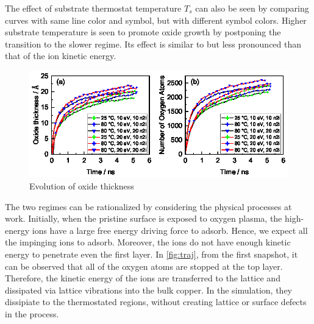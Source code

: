 \documentclass[manuscript=cmatex]{achemso}
\begin{document}
The effect of substrate thermostat temperature $T_s$ can also be seen by comparing curves with same line color and symbol, but with different symbol colors. Higher substrate temperature is seen to promote oxide growth by postponing the transition to the slower regime. Its effect is similar to but less pronounced than that of the ion kinetic energy. 

\begin{figure}[h]
  \centering
  \includegraphics[width=\textwidth]{fig_thicknumo_100}
  \caption[Evolution of oxide thickness]{Evolution of oxide thickness}
  \label{fig:thickness}
\end{figure}

The two regimes can be rationalized by considering the physical processes at work. Initially, when the pristine surface is exposed to oxygen plasma, the high-energy ions have a large free energy driving force to adsorb. Hence, we expect all the impinging ions to adsorb. Moreover, the ions do not have enough kinetic energy to penetrate even the first layer. In \cref{fig:traj}, from the first snapshot, it can be observed that all of the oxygen atoms are stopped at the top layer. Therefore, the kinetic energy of the ions are transferred to the  lattice and dissipated via lattice vibrations into the bulk copper. In the simulation, they dissipiate to the thermostated regions, without creating lattice or surface defects in the process. 
\end{document}
